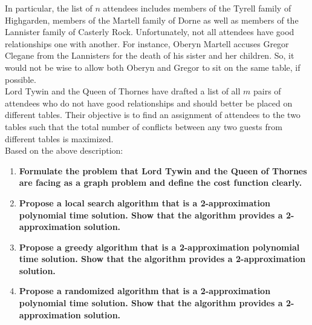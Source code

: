 \documentclass[11pt]{article}
\begin{document}
\noindent In particular, the list of $n$ attendees includes members of
the Tyrell family of Highgarden, members of the Martell family of
Dorne as well as members of the Lannister family of Casterly
Rock. Unfortunately, not all attendees have good relationships one
with another. For instance, Oberyn Martell accuses Gregor Clegane from
the Lannisters for the death of his sister and her children. So, it
would not be wise to allow both Oberyn and Gregor to sit on the same
table, if possible.\\

\noindent Lord Tywin and the Queen of Thornes have drafted a list of
all $m$ pairs of attendees who do not have good relationships and
should better be placed on different tables. Their objective is to
find an assignment of attendees to the two tables such that the total
number of conflicts between any two guests from different tables is
maximized.\\

\noindent Based on the above description:

\begin{enumerate}
\item \textbf{Formulate the problem that Lord Tywin and the Queen of Thornes
  are facing as a graph problem and define the cost function clearly.}
\item \textbf{Propose a local search algorithm that is a 2-approximation
  polynomial time solution. Show that the algorithm provides a
  2-approximation solution.}
\item \textbf{Propose a greedy algorithm that is a  2-approximation
  polynomial time solution. Show that the algorithm provides a
  2-approximation solution.}
\item \textbf{Propose a randomized algorithm that is a 2-approximation
  polynomial time solution. Show that the algorithm provides a
  2-approximation solution.}
\end{enumerate}

\\
\end{document}
